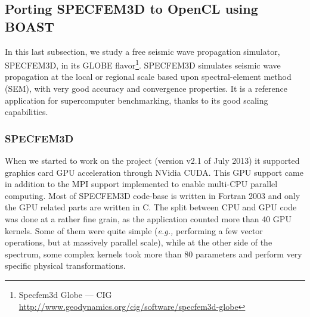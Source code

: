 \documentclass{IEEEtran}
\newcommand{\latin}[1]{\textit{#1}}
\newcommand{\eg}{\latin{e.g.,}\xspace}
\begin{document}
% 
% 
% 
% 
 

\subsection{Porting SPECFEM3D to OpenCL using BOAST\label{subsec:specfem}}

In this last subsection, we study a free seismic wave propagation simulator,
SPECFEM3D, in its GLOBE flavor\footnote{Specfem3d Globe --- CIG
\url{http://www.geodynamics.org/cig/software/specfem3d-globe}}. SPECFEM3D
simulates seismic wave propagation at the local or regional scale based upon
spectral-element method (SEM), with very good accuracy and convergence
properties. It is a reference application for supercomputer benchmarking,
thanks to its good scaling capabilities.

\subsubsection{SPECFEM3D}

When we started to work on the project (version v2.1 of July 2013) it
supported graphics card GPU acceleration through NVidia CUDA. This
GPU support came in addition to the MPI support implemented to enable
multi-CPU parallel computing. Most of SPECFEM3D code-base is written in
Fortran 2003 and only the GPU related parts are written in
C.  The split between CPU and GPU code was done at a rather fine
grain, as the application counted more than 40 GPU kernels. Some of
them were quite simple (\eg performing a few vector operations, but at
massively parallel scale), while at the other side of the spectrum,
some complex kernels took more than 80 parameters and perform very
specific physical transformations.
\end{document}
